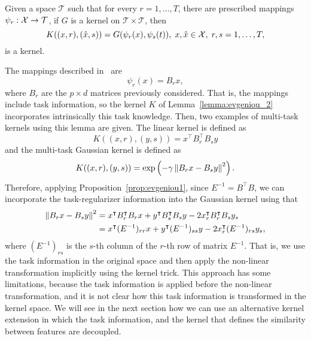 \begin{lemma}\label{lemma:evgeniou_2}
    Given a space $\mathcal{T}$ such that for every $r=1, \ldots, T$, there are prescribed mappings
    $\psi_r: \mathcal{X} \to \mathcal{T}$, if $G$ is a kernel on $\mathcal{T} \times \mathcal{T}$, then
    \begin{equation}
        \label{eq:evgeniou_lemma2}
        K((x, r), (\hat{x}, s)) = G(\psi_r(x), \psi_s(t)),\; x, \hat{x} \in \Xspace,\; r,s = 1, \ldots, \ntasks ,
    \end{equation}
    is a kernel.
\end{lemma}
The mappings described in~\cite{EvgeniouMP05} are
$$ \psi_r(x) = B_r x ,$$
where $B_r$ are the $p \times d$ matrices previously considered. That is, the mappings include task information, so the kernel $K$ of Lemma~\ref{lemma:evgeniou_2} incorporates intrinsically this task knowledge.
Then, two examples of multi-task kernels using this lemma are given. The linear kernel is defined as
$$ K((x, r), (y, s)) = x^\intercal B_r^\intercal B_s y $$
and the multi-task Gaussian kernel is defined as
$$ K((x, r), (y, s)) = \exp\left(-\gamma \left\lVert B_r x - B_s y\right\rVert^2 \right) .$$
Therefore, applying Proposition~\ref{prop:evgeniou1}, since $E^{-1} = B^\intercal B$, we can incorporate the task-regularizer information into the Gaussian kernel using that
\begin{align*}
    \left\lVert B_r x - B_s y\right\rVert^2
     & = x^\intercal B_r^\intercal B_r x + y^\intercal B_s^\intercal B_s y - 2 x_r^\intercal B_r^\intercal B_s y_s \\
     & = x^\intercal (E^{-1})_{rr} x + y^\intercal (E^{-1})_{ss} y - 2 x_r^\intercal (E^{-1})_{rs} y_s ,
\end{align*}
where $(E^{-1})_{rs}$ is the $s$-th column of the $r$-th row of matrix $E^{-1}$.
That is, we use the task information in the original space and then apply the non-linear transformation implicitly using the kernel trick.
%
This approach has some limitations, because the task information is applied before the non-linear transformation, and it is not clear how this task information is transformed in the kernel space.
We will see in the next section how we can use an alternative kernel extension in which the task information, and the kernel that defines the similarity between features are decoupled.


